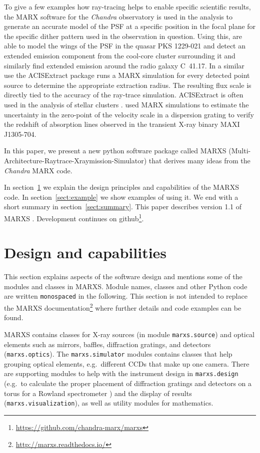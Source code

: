 \documentclass[twocolumn]{aastex61}
\begin{document}
To give a few examples how ray-tracing helps to enable specific scientific
results, the MARX software \citep{2012SPIE.8443E..1AD,2013ascl.soft02001W} for
the \emph{Chandra} observatory is used in the analysis to generate an accurate
model of the PSF at a specific position in the focal plane for the specific
dither pattern used in the observation in question. Using this,
\citet{2012MNRAS.422..590R} are able to model the wings of the PSF in the
quasar PKS 1229-021 and detect an extended emission component from the
cool-core cluster surrounding it and similarly \citet{2017MNRAS.468..109W} find
extended emission around the radio galaxy C~41.17. In a similar use the
ACISExtract package \citep{2010ApJ...714.1582B,2012ascl.soft03001B} runs a MARX
simulation for every detected point source to determine the appropriate
extraction radius. The resulting flux scale is directly tied to the accuracy of
the ray-trace simulation. ACISExtract is often used in the analysis of stellar
clusters \citep[e.g.][]{2013ApJS..209...27K}. \citet{2014ApJ...788...53M} used
MARX simulations to estimate the uncertainty in the zero-point of the velocity
scale in a dispersion grating to verify the redshift of absorption lines
observed in the transient X-ray binary MAXI J1305-704.

In this paper, we present a new python software package called MARXS
(Multi-Architecture-Raytrace-Xraymission-Simulator) that derives many ideas from
the \emph{Chandra} MARX code.

In section~\ref{sect:design} we explain the design principles and capabilities
of the MARXS code. In section~\ref{sect:example} we show examples of using
it.
We end with a short summary in section~\ref{sect:summary}. This paper describes
version 1.1 of MARXS \citep{marxs1.1}.
Development continues on github\footnote{\url{https://github.com/chandra-marx/marxs}}.

\section{Design and capabilities}
\label{sect:design}
This section explains aspects of the software design and mentions some of
the modules and classes in MARXS. Module names, classes and other Python code
are written \texttt{monospaced} in the following. This section is not intended
to replace the MARXS documentation\footnote{\url{http://marxs.readthedocs.io/}}
where further details and code examples can be found.

MARXS contains classes for X-ray sources (in module \texttt{marxs.source}) and
optical elements such as mirrors, baffles, diffraction gratings, and detectors
(\texttt{marxs.optics}). The \texttt{marxs.simulator} modules contains classes
that help grouping optical elements, e.g.\ different CCDs that make up one
camera. There are supporting modules to help with the instrument design in
\texttt{marxs.design} (e.g.\ to calculate the proper placement of diffraction
gratings and detectors on a torus for a Rowland spectrometer \citep[see
  e.g.][]{Beuermann:78}) and the display of results
(\texttt{marxs.visualization}), as well as utility modules for mathematics.
\end{document}
